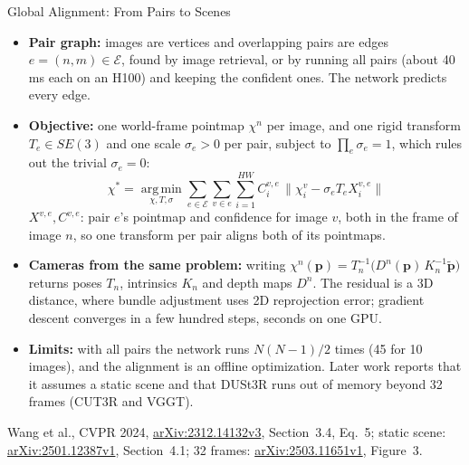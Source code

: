 \begin{frame}{Global Alignment: From Pairs to Scenes}
  \begin{itemize}\footnotesize\itemsep0.35em
    \setlength{\abovedisplayskip}{4pt}\setlength{\belowdisplayskip}{4pt}
    \item \textbf{Pair graph:} images are vertices and overlapping pairs are edges $e=(n,m)\in\mathcal{E}$, found by image retrieval, or by running all pairs (about 40\,ms each on an H100) and keeping the confident ones. The network predicts every edge.
    \item \textbf{Objective:} one world-frame pointmap $\chi^n$ per image, and one rigid transform $T_e\in SE(3)$ and one scale $\sigma_e>0$ per pair, subject to $\prod_e\sigma_e=1$, which rules out the trivial $\sigma_e=0$:
    \[ \chi^{*} = \operatorname*{arg\,min}_{\chi,T,\sigma} \sum_{e\in\mathcal{E}} \sum_{v\in e} \sum_{i=1}^{HW} C_i^{v,e}\, \big\lVert \chi_i^{v} - \sigma_e T_e X_i^{v,e} \big\rVert \]
    $X^{v,e}, C^{v,e}$: pair $e$'s pointmap and confidence for image $v$, both in the frame of image $n$, so one transform per pair aligns both of its pointmaps.
    \item \textbf{Cameras from the same problem:} writing $\chi^n(\mathbf{p}) = T_n^{-1}\big(D^n(\mathbf{p})\,K_n^{-1}\tilde{\mathbf{p}}\big)$ returns poses $T_n$, intrinsics $K_n$ and depth maps $D^n$. The residual is a 3D distance, where bundle adjustment uses 2D reprojection error; gradient descent converges in a few hundred steps, seconds on one GPU.
    \item \textbf{Limits:} with all pairs the network runs $N(N-1)/2$ times (45 for 10 images), and the alignment is an offline optimization. Later work reports that it assumes a static scene and that DUSt3R runs out of memory beyond 32 frames (CUT3R and VGGT).
  \end{itemize}
  \vspace{0.2em}
  {\scriptsize Wang et al., CVPR 2024, \href{https://arxiv.org/abs/2312.14132v3}{arXiv:2312.14132v3}, Section~3.4, Eq.~5; static scene: \href{https://arxiv.org/abs/2501.12387v1}{arXiv:2501.12387v1}, Section~4.1; 32 frames: \href{https://arxiv.org/abs/2503.11651v1}{arXiv:2503.11651v1}, Figure~3.\par}
\end{frame}

